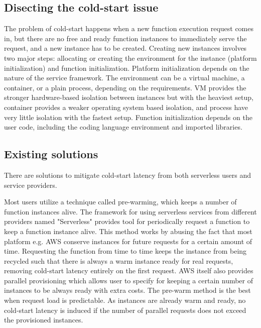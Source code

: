 \documentclass[conference]{IEEEtran}
\begin{document}
\subsection{Disecting the cold-start issue}
The problem of cold-start happens when a new function execution request comes in, but there are no free and ready function instances to immediately serve the request, and a new instance has to be created. Creating new instances involves two major steps: allocating or creating the environment for the instance (platform initialization) and function initialization\cite{mohanAgileColdStarts2019}. Platform initialization depends on the nature of the service framework. The environment can be a virtual machine, a container, or a plain process, depending on the requirements. VM provides the stronger hardware-based isolation between instances but with the heaviest setup, container provides a weaker operating system based isolation, and process have very little isolation with the fastest setup. Function initialization depends on the user code, including the coding language environment and imported libraries. 

\subsection{Existing solutions}
There are solutions to mitigate cold-start latency from both serverless users and service providers. 

Most users utilize a technique called pre-warming, which keeps a number of function instances alive\cite{NewAWSLambda2019,KeepingFunctionsWarm}. The framework for using serverless services from different providers named "Serverless" provides tool for periodically request a function to keep a function instance alive\cite{KeepingFunctionsWarm}. This method works by abusing the fact that most platform e.g. AWS conserve instances for future requests for a certain amount of time. Requesting the function from time to time keeps the instance from being recycled such that there is always a warm instance ready for real requests, removing cold-start latency entirely on the first request. AWS itself also provides parallel provisioning\cite{NewAWSLambda2019} which allows user to specify for keeping a certain number of instances to be always ready with extra costs. The pre-warm method is the best when request load is predictable. As instances are already warm and ready, no cold-start latency is induced if the number of parallel requests does not exceed the provisioned instances.
\end{document}
